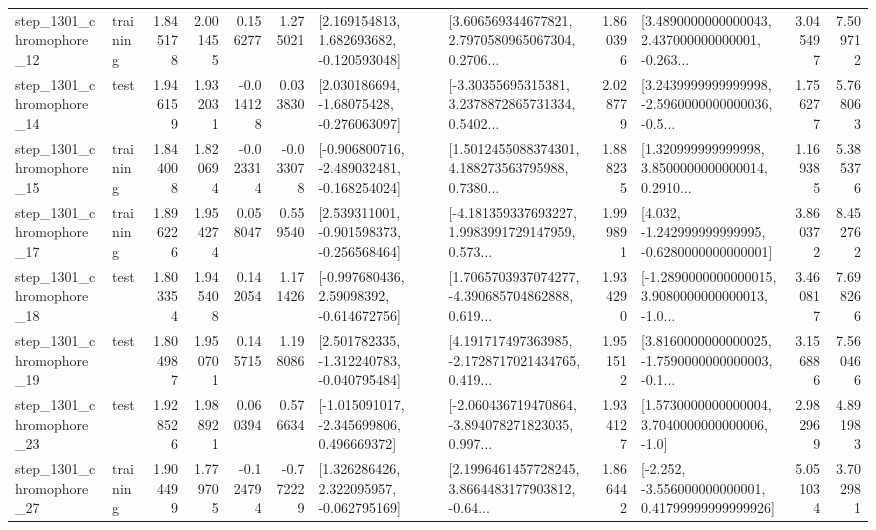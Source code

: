 \begin{tabular}{llrrrrllrlrr}
 step\_1301\_chromophore\_12 &  training &      1.845178 &    2.001455 &      0.156277 &  1.275021 &    [2.169154813, 1.682693682, -0.120593048] &  [3.606569344677821, 2.7970580965067304, 0.2706... &       1.860396 &  [3.4890000000000043, 2.437000000000001, -0.263... &            3.045497 &          7.509712 \\
 step\_1301\_chromophore\_14 &      test &      1.946159 &    1.932031 &     -0.014128 &  0.033830 &    [2.030186694, -1.68075428, -0.276063097] &  [-3.30355695315381, 3.2378872865731334, 0.5402... &       2.028779 &  [3.2439999999999998, -2.5960000000000036, -0.5... &            1.756277 &          5.768063 \\
 step\_1301\_chromophore\_15 &  training &      1.844008 &    1.820694 &     -0.023314 & -0.033078 &  [-0.906800716, -2.489032481, -0.168254024] &  [1.5012455088374301, 4.188273563795988, 0.7380... &       1.888235 &  [1.320999999999998, 3.8500000000000014, 0.2910... &            1.169385 &          5.385376 \\
 step\_1301\_chromophore\_17 &  training &      1.896226 &    1.954274 &      0.058047 &  0.559540 &   [2.539311001, -0.901598373, -0.256568464] &  [-4.181359337693227, 1.9983991729147959, 0.573... &       1.999891 &   [4.032, -1.242999999999995, -0.6280000000000001] &            3.860372 &          8.452762 \\
 step\_1301\_chromophore\_18 &      test &      1.803354 &    1.945408 &      0.142054 &  1.171426 &    [-0.997680436, 2.59098392, -0.614672756] &  [1.7065703937074277, -4.390685704862888, 0.619... &       1.934290 &  [-1.2890000000000015, 3.9080000000000013, -1.0... &            3.460817 &          7.698266 \\
 step\_1301\_chromophore\_19 &      test &      1.804987 &    1.950701 &      0.145715 &  1.198086 &   [2.501782335, -1.312240783, -0.040795484] &  [4.191717497363985, -2.1728717021434765, 0.419... &       1.951512 &  [3.8160000000000025, -1.7590000000000003, -0.1... &            3.156886 &          7.560466 \\
 step\_1301\_chromophore\_23 &      test &      1.928526 &    1.988921 &      0.060394 &  0.576634 &   [-1.015091017, -2.345699806, 0.496669372] &  [-2.060436719470864, -3.894078271823035, 0.997... &       1.934127 &     [1.5730000000000004, 3.7040000000000006, -1.0] &            2.982969 &          4.891983 \\
 step\_1301\_chromophore\_27 &  training &      1.904499 &    1.779705 &     -0.124794 & -0.772229 &    [1.326286426, 2.322095957, -0.062795169] &  [2.1996461457728245, 3.8664483177903812, -0.64... &       1.866442 &  [-2.252, -3.556000000000001, 0.41799999999999926] &            5.051034 &          3.702981 \\

\end{tabular}
